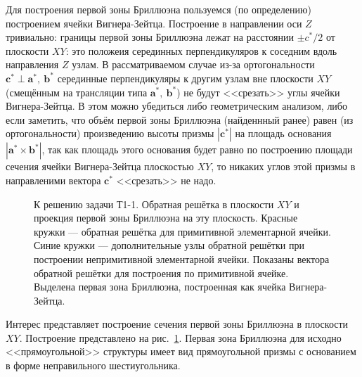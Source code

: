 \documentclass[a4paper]{article}
\begin{document}
\begin{sol}
Для построения первой зоны Бриллюэна пользуемся (по определению) построением ячейки Вигнера-Зейтца. Построение в направлении оси $Z$ тривиально: границы первой зоны Бриллюэна лежат
на расстоянии $\pm c^* /2$ от плоскости $XY$: это положеия
серединных перпендикуляров к соседним вдоль направления
$Z$ узлам. В рассматриваемом случае из-за ортогональности 
$\mathbf{c}^*\perp \mathbf{a}^*,\ \mathbf{b}^*$ серединные
перпендикуляры к другим узлам вне плоскости $XY$ 
(смещённым на трансляции типа $\mathbf{a}^*,\ \mathbf{b}^*$)
не будут <<срезать>> углы ячейки  Вигнера-Зейтца. В этом
можно убедиться либо геометрическим анализом, либо
если заметить, что объём первой зоны Бриллюэна (найденнный
ранее) равен (из ортогональности) произведению высоты
призмы $|\mathbf{c}^*|$ на площадь основания $\left| \mathbf{a}^*\times \mathbf{b}^* \right| $, так как площадь
этого основания будет равно по построению площади
сечения ячейки Вигнера-Зейтца плоскостью $XY$, то
никаких углов этой призмы в направленими вектора $\mathbf{c}^*$ 
<<срезать>> не надо.
\begin{figure}[ht]
    \centering
    \caption{К решению задачи Т1-1. Обратная решётка в плоскости
    $XY$ и проекция первой зоны Бриллюэна на эту плоскость. Красные
    кружки --- обратная решётка для примитивной элементарной
    ячейки. Синие кружки --- дополнительные узлы обратной
    решётки при построении непримитивной элементарной ячейки. Показаны
    вектора обратной решётки для построения по примитивной ячейке.
    Выделена первая зона Бриллюэна, построенная как ячейка Вигнера-Зейтца.}
    \label{fig:5}
\end{figure}
Интерес представляет построение сечения первой зоны Бриллюэна в плоскости
$XY$. Построение представлено на рис.~\ref{fig:5}. Первая зона
Бриллюэна для исходно <<прямоугольной>> структуры имеет вид прямоугольной
призмы с основанием в форме неправильного шестиугольника.
%
\end{sol}
\end{document}
